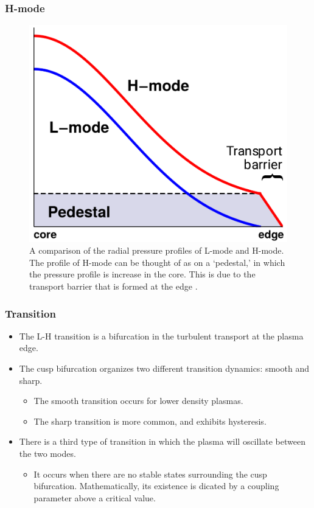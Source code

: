 \documentclass{beamer}
\begin{document}
\begin{frame}
\frametitle{H-mode}
\begin{figure}
	\includegraphics[width=0.5\linewidth]{../../Graphics/L-mode_H-mode_compare.png}
	\caption{A comparison of the radial pressure profiles of L-mode and H-mode.
	The profile of H-mode can be thought of as on a ‘pedestal,’ in which the pressure profile is increase in the core.
	This is due to the transport barrier that is formed at the
	edge \cite{weymiens_bifurcation_2014}.}
	\label{fig:L-mode_H-mode_compare}
\end{figure}
\end{frame}


\begin{frame}
\frametitle{Transition}
\begin{itemize}
	\item The L-H transition is a bifurcation in the turbulent transport at the plasma edge.
	\item The cusp bifurcation organizes two different transition dynamics: smooth and sharp.
	\begin{itemize}
		\item The smooth transition occurs for lower density plasmas.
		\item The sharp transition is more common, and exhibits hysteresis.
	\end{itemize}
	\item There is a third type of transition in which the plasma will oscillate between the two modes.
	\begin{itemize}
		\item It occurs when there are no stable states surrounding the cusp bifurcation.
		Mathematically, its existence is dicated by a coupling parameter above a critical value.
	\end{itemize}
\end{itemize}
\end{frame}
\end{document}
